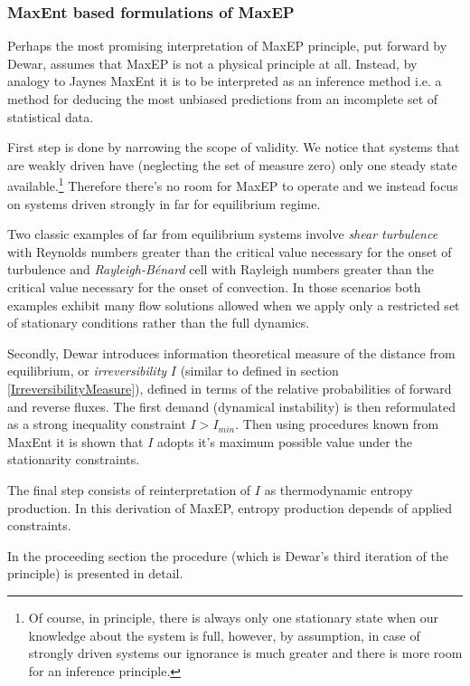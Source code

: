 \documentclass[a4paper,12pt]{article}
\begin{document}
\subsubsection{MaxEnt based formulations of MaxEP}

Perhaps the most promising interpretation of MaxEP principle, put forward by Dewar\cite{Dewar:775452, Dewar:2009fg, Dewar:2005eo}, assumes that MaxEP is not a physical principle at all. Instead, by analogy to Jaynes MaxEnt it is to be interpreted as an inference method i.e. a method for deducing the most unbiased predictions from an incomplete set of statistical data. 

First step is done by narrowing the scope of validity. We notice that systems that are weakly driven have (neglecting the set of measure zero) only one steady state available.\footnote{Of course, in principle, there is always only one stationary state when our knowledge about the system is full, however, by assumption, in case of strongly driven systems our ignorance is much greater and there is more room for an inference principle.} Therefore there's no room for MaxEP to operate and we instead focus on systems driven strongly in far for equilibrium regime.

Two classic examples of far from equilibrium systems involve \textit{shear turbulence} with Reynolds numbers greater than the critical value necessary for the onset of turbulence and \textit{Rayleigh-Bénard} cell with Rayleigh numbers greater than the critical value necessary for the onset of convection.
In those scenarios both examples exhibit many flow solutions allowed when we apply only a restricted set of stationary conditions rather than the full dynamics.

Secondly, Dewar introduces information theoretical measure of the distance from equilibrium, or \textit{irreversibility} $I$ (similar to defined in section \ref{IrreversibilityMeasure}), defined in terms of the relative probabilities of forward and reverse fluxes. 
The first demand (dynamical instability) is then reformulated as a strong inequality constraint $I>I_{min}$. 
Then using procedures known from MaxEnt it is shown that $I$ adopts it's maximum possible value under the stationarity constraints.

The final step consists of reinterpretation of $I$ as thermodynamic entropy production. In this derivation of MaxEP, entropy production depends of applied constraints.

In the proceeding section the procedure (which is Dewar's third iteration of the principle) is presented in detail.
\end{document}

